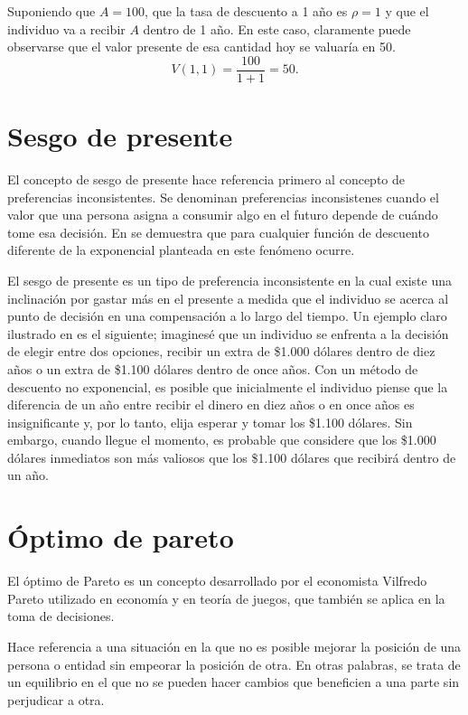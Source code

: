 Suponiendo que $A=100$, que la tasa de descuento a 1 año es $\rho=1$ y que el individuo va a recibir $A$ dentro de 1 año. En este caso, claramente puede observarse que el valor presente de esa cantidad hoy se valuaría en 50.
$$V(1,1)= \dfrac{100}{1+1}=50.$$


\section{Sesgo de presente} \label{Sec_pi}
El concepto de sesgo de presente hace referencia primero al concepto de preferencias inconsistentes. Se denominan preferencias inconsistenes cuando el valor que una persona asigna a consumir algo en el futuro depende de cuándo tome esa decisión. En \parencite{Strotz55} se demuestra que para cualquier función de descuento diferente de la exponencial planteada en \parencite{Samuelson37} este fenómeno ocurre. 

El sesgo de presente es un tipo de preferencia inconsistente en la cual existe una inclinación por gastar más en el presente a medida que el individuo se acerca al punto de decisión en una compensación a lo largo del tiempo. Un ejemplo claro ilustrado en \parencite{feigenbaum2021deviation} es el siguiente; imaginesé que un individuo se enfrenta a la decisión de elegir entre dos opciones, recibir un extra de \$1.000 dólares dentro de diez años o un extra de \$1.100 dólares dentro de once años. Con un método de descuento no exponencial, es posible que inicialmente el individuo piense que la diferencia de un año entre recibir el dinero en diez años o en once años es insignificante y, por lo tanto, elija esperar y tomar los \$1.100 dólares. Sin embargo, cuando llegue el momento, es probable que considere que los \$1.000 dólares inmediatos son más valiosos que los \$1.100 dólares que recibirá dentro de un año.



\section{Óptimo de pareto} \label{Sec_edp}
El óptimo de Pareto es un concepto desarrollado por el economista Vilfredo Pareto utilizado en economía y en teoría de juegos, que también se aplica en la toma de decisiones. 

Hace referencia a una situación en la que no es posible mejorar la posición de una persona o entidad sin empeorar la posición de otra. En otras palabras, se trata de un equilibrio en el que no se pueden hacer cambios que beneficien a una parte sin perjudicar a otra. 

